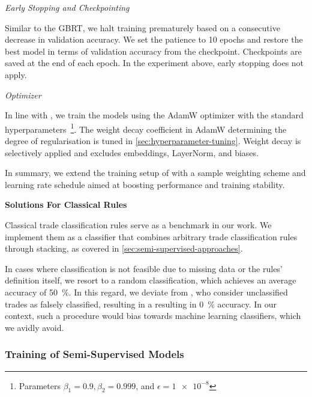 \emph{Early Stopping and Checkpointing}

Similar to the \gls{GBRT}, we halt training prematurely based on a consecutive decrease in validation accuracy. We set the patience to \num{10} epochs and restore the best model in terms of validation accuracy from the checkpoint. Checkpoints are saved at the end of each epoch. In the experiment above, early stopping does not apply.

\emph{Optimizer}

In line with \textcite[][6]{gorishniyRevisitingDeepLearning2021}, we train the models using the AdamW optimizer \autocite[][2--3]{loshchilovDecoupledWeightDecay2019} with the standard hyperparameters~\footnote{Parameters $\beta_{1}=0.9, \beta_{2}=0.999$, and $\epsilon = \num{1e-8}$}. The weight decay coefficient in AdamW determining the degree of regularisation is tuned in \cref{sec:hyperparameter-tuning}. Weight decay is selectively applied and excludes embeddings, LayerNorm, and biases.


In summary, we extend the training setup of \textcite[][6]{gorishniyRevisitingDeepLearning2021} with a sample weighting scheme and learning rate schedule aimed at boosting performance and training stability.

\textbf{Solutions For Classical Rules}

Classical trade classification rules serve as a benchmark in our work. We implement them as a classifier that combines arbitrary trade classification rules through stacking, as covered in \cref{sec:semi-supervised-approaches}.

In cases where classification is not feasible due to missing data or the rules' definition itself, we resort to a random classification, which achieves an average accuracy of \SI{50}{\percent}. In this regard, we deviate from \textcite[][29--32]{grauerOptionTradeClassification2022}, who consider unclassified trades as falsely classified, resulting in a resulting in \SI{0}{\percent} accuracy. In our context, such a procedure would bias towards machine learning classifiers, which we avidly avoid.

\subsubsection{Training of Semi-Supervised
    Models}\label{sec:training-of-semi-supervised-models}

